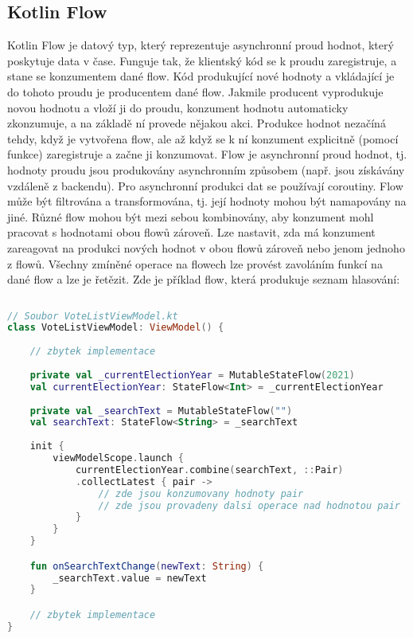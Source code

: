 \subsection*{Kotlin Flow}
Kotlin Flow \cite{kotlinflow} je datový typ, který reprezentuje asynchronní proud hodnot, který poskytuje data v čase. Funguje tak, že klientský kód se k proudu zaregistruje, a stane se konzumentem dané flow. Kód produkující nové hodnoty a vkládající je do tohoto proudu je producentem dané flow. Jakmile producent vyprodukuje novou hodnotu a vloží ji do proudu, konzument hodnotu automaticky zkonzumuje, a na základě ní provede nějakou akci. Produkce hodnot nezačíná \linebreak tehdy, když je vytvořena flow, ale až když se k ní konzument explicitně (pomocí funkce) zaregistruje a začne ji konzumovat. Flow je asynchronní proud hodnot, tj. hodnoty proudu jsou produkovány asynchronním způsobem (např. jsou získávány vzdáleně z backendu). Pro asynchronní produkci dat se používají coroutiny. Flow může být filtrována a transformována, tj. její hodnoty mohou být namapovány na jiné. Různé flow mohou být mezi sebou kombinovány, aby konzument mohl pracovat s hodnotami obou flowů zároveň. Lze nastavit, zda má konzument zareagovat na produkci nových hodnot v obou flowů zároveň nebo jenom jednoho z flowů. Všechny zmíněné operace na flowech lze provést zavoláním funkcí na dané flow a lze je řetězit. Zde je příklad flow, která produkuje seznam hlasování:

\begin{lstlisting}[caption={Příklad použití flow}, label={lst:flow-general}, tabsize=2, language=Kotlin]
	
// Soubor VoteListViewModel.kt
class VoteListViewModel: ViewModel() {
	
	// zbytek implementace
	
	private val _currentElectionYear = MutableStateFlow(2021)	
	val currentElectionYear: StateFlow<Int> = _currentElectionYear
	
	private val _searchText = MutableStateFlow("")
	val searchText: StateFlow<String> = _searchText
	
	init {
		viewModelScope.launch {
			currentElectionYear.combine(searchText, ::Pair)
			.collectLatest { pair ->
				// zde jsou konzumovany hodnoty pair
				// zde jsou provadeny dalsi operace nad hodnotou pair
			}
		}
	}

	fun onSearchTextChange(newText: String) {
		_searchText.value = newText
	}

	// zbytek implementace
}
\end{lstlisting}

